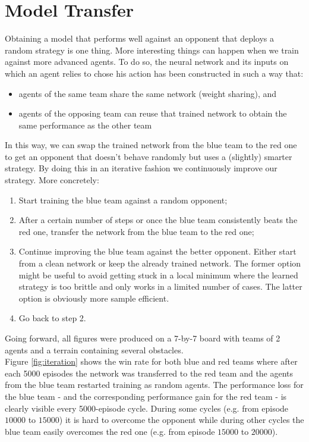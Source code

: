 \section{Model Transfer}
\label{sec:model_transfer}
Obtaining a model that performs well against an opponent that deploys a random strategy is one thing. More interesting things can happen when we train against more advanced agents. To do so, the neural network and its inputs on which an agent relies to chose his action has been constructed in such a way that:
\begin{itemize}
    \item agents of the same team share the same network (weight sharing), and
    \item agents of the opposing team can reuse that trained network to obtain the same performance as the other team
\end{itemize}
In this way, we can swap the trained network from the blue team to the red one to get an opponent that doesn't behave randomly but uses a (slightly) smarter strategy. By doing this in an iterative fashion we continuously improve our strategy. More concretely:
\begin{enumerate}
    \item Start training the blue team against a random opponent;
    \item After a certain number of steps or once the blue team consistently beats the red one, transfer the network from the blue team to the red one;
    \item Continue improving the blue team against the better opponent. Either start from a clean network or keep the already trained network. The former option might be useful to avoid getting stuck in a local minimum where the learned strategy is too brittle and only works in a limited number of cases. The latter option is obviously more sample efficient.
    \item Go back to step 2.
\end{enumerate}
Going forward, all figures were produced on a 7-by-7 board with teams of 2 agents and a terrain containing several obstacles.\\
Figure \ref{fig:iteration} shows the win rate for both blue and red teams where after each 5000 episodes the network was transferred to the red team and the agents from the blue team restarted training as random agents. The performance loss for the blue team - and the corresponding performance gain for the red team - is clearly visible every 5000-episode cycle. During some cycles (e.g. from episode $10000$ to $15000$) it is hard to overcome the opponent while during other cycles the blue team easily overcomes the red one (e.g. from episode $15000$ to $20000$).\\
